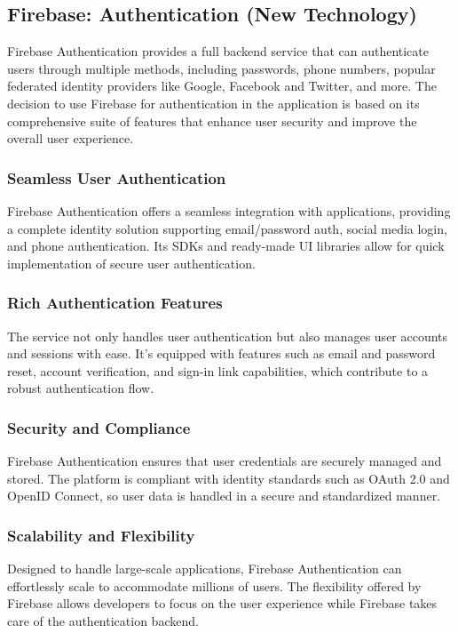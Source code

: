 \subsection{Firebase: Authentication (New Technology)}

Firebase Authentication provides a full backend service that can authenticate users through multiple methods, including passwords, phone numbers, popular federated identity providers like Google, Facebook and Twitter, and more. The decision to use Firebase for authentication in the application is based on its comprehensive suite of features that enhance user security and improve the overall user experience.

\subsubsection{Seamless User Authentication}
Firebase Authentication offers a seamless integration with applications, providing a complete identity solution supporting email/password auth, social media login, and phone authentication. Its SDKs and ready-made UI libraries allow for quick implementation of secure user authentication.

\subsubsection{Rich Authentication Features}
The service not only handles user authentication but also manages user accounts and sessions with ease. It's equipped with features such as email and password reset, account verification, and sign-in link capabilities, which contribute to a robust authentication flow.

\subsubsection{Security and Compliance}
Firebase Authentication ensures that user credentials are securely managed and stored. The platform is compliant with identity standards such as OAuth 2.0 and OpenID Connect, so user data is handled in a secure and standardized manner. 

\subsubsection{Scalability and Flexibility}
Designed to handle large-scale applications, Firebase Authentication can effortlessly scale to accommodate millions of users. The flexibility offered by Firebase allows developers to focus on the user experience while Firebase takes care of the authentication backend.

